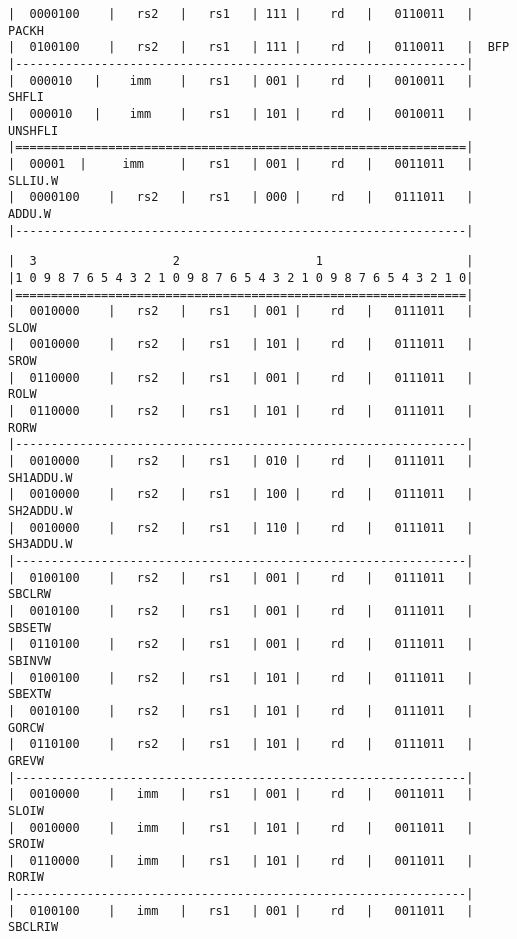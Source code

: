 \begin{minipage}{\linewidth}
\begin{verbatim}
|  0000100    |   rs2   |   rs1   | 111 |    rd   |   0110011   |  PACKH
|  0100100    |   rs2   |   rs1   | 111 |    rd   |   0110011   |  BFP
|---------------------------------------------------------------|
|  000010   |    imm    |   rs1   | 001 |    rd   |   0010011   |  SHFLI
|  000010   |    imm    |   rs1   | 101 |    rd   |   0010011   |  UNSHFLI
|===============================================================|
|  00001  |     imm     |   rs1   | 001 |    rd   |   0011011   |  SLLIU.W
|  0000100    |   rs2   |   rs1   | 000 |    rd   |   0111011   |  ADDU.W
|---------------------------------------------------------------|
\end{verbatim}
\end{minipage}

\begin{minipage}{\linewidth}
\begin{verbatim}
|  3                   2                   1                    |
|1 0 9 8 7 6 5 4 3 2 1 0 9 8 7 6 5 4 3 2 1 0 9 8 7 6 5 4 3 2 1 0|
|===============================================================|
|  0010000    |   rs2   |   rs1   | 001 |    rd   |   0111011   |  SLOW
|  0010000    |   rs2   |   rs1   | 101 |    rd   |   0111011   |  SROW
|  0110000    |   rs2   |   rs1   | 001 |    rd   |   0111011   |  ROLW
|  0110000    |   rs2   |   rs1   | 101 |    rd   |   0111011   |  RORW
|---------------------------------------------------------------|
|  0010000    |   rs2   |   rs1   | 010 |    rd   |   0111011   |  SH1ADDU.W
|  0010000    |   rs2   |   rs1   | 100 |    rd   |   0111011   |  SH2ADDU.W
|  0010000    |   rs2   |   rs1   | 110 |    rd   |   0111011   |  SH3ADDU.W
|---------------------------------------------------------------|
|  0100100    |   rs2   |   rs1   | 001 |    rd   |   0111011   |  SBCLRW
|  0010100    |   rs2   |   rs1   | 001 |    rd   |   0111011   |  SBSETW
|  0110100    |   rs2   |   rs1   | 001 |    rd   |   0111011   |  SBINVW
|  0100100    |   rs2   |   rs1   | 101 |    rd   |   0111011   |  SBEXTW
|  0010100    |   rs2   |   rs1   | 101 |    rd   |   0111011   |  GORCW
|  0110100    |   rs2   |   rs1   | 101 |    rd   |   0111011   |  GREVW
|---------------------------------------------------------------|
|  0010000    |   imm   |   rs1   | 001 |    rd   |   0011011   |  SLOIW
|  0010000    |   imm   |   rs1   | 101 |    rd   |   0011011   |  SROIW
|  0110000    |   imm   |   rs1   | 101 |    rd   |   0011011   |  RORIW
|---------------------------------------------------------------|
|  0100100    |   imm   |   rs1   | 001 |    rd   |   0011011   |  SBCLRIW

\end{verbatim}
\end{minipage}
